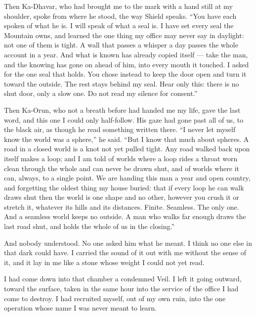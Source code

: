 Then Ka-Dhavar, who had brought me to the mark with a hand still at my shoulder, spoke from where he stood, the way Shield speaks. ``You have each spoken of what he is. I will speak of what a seal is. I have set every seal the Mountain owns, and learned the one thing my office may never say in daylight: not one of them is tight. A wall that passes a whisper a day passes the whole account in a year. And what is known has already copied itself --- take the man, and the knowing has gone on ahead of him, into every mouth it touched. I asked for the one seal that holds. You chose instead to keep the door open and turn it toward the outside. The rest stays behind my seal. Hear only this: there is no shut door, only a slow one. Do not read my silence for consent.''\par

Then Ka-Orun, who not a breath before had handed me my life, gave the last word, and this one I could only half-follow. His gaze had gone past all of us, to the black air, as though he read something written there. ``I never let myself know the world was a sphere,'' he said. ``But I know that much about spheres. A road in a closed world is a knot not yet pulled tight. Any road walked back upon itself makes a loop; and I am told of worlds where a loop rides a throat worn clean through the whole and can never be drawn shut, and of worlds where it can, always, to a single point. We are handing this man a year and open country, and forgetting the oldest thing my house buried: that if every loop he can walk draws shut then the world is one shape and no other, however you crush it or stretch it, whatever its hills and its distances. Finite. Seamless. The only one. And a seamless world keeps no outside. A man who walks far enough draws the last road shut, and holds the whole of us in the closing.''\par

And nobody understood. No one asked him what he meant. I think no one else in that dark could have. I carried the sound of it out with me without the sense of it, and it lay in me like a stone whose weight I could not yet read.\par

\ornament

I had come down into that chamber a condemned Veil. I left it going outward, toward the surface, taken in the same hour into the service of the office I had come to destroy. I had recruited myself, out of my own ruin, into the one operation whose name I was never meant to learn.\par

